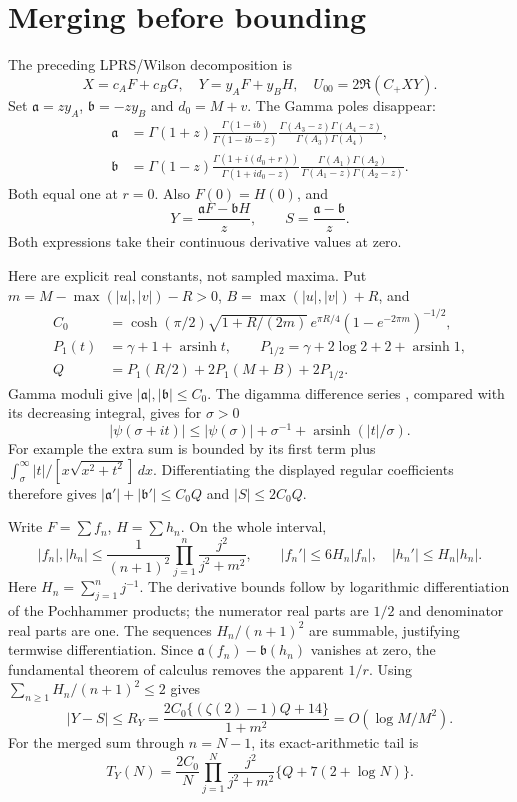 \documentclass[11pt,a4paper]{article}
\newcommand{\ga}{\mathfrak a}
\newcommand{\gb}{\mathfrak b}
\begin{document}
\newpage
\section{Merging before bounding}
The preceding LPRS/Wilson decomposition \cite{lprs,wilson} is
\[
 X=c_AF+c_BG,\quad Y=y_AF+y_BH,\quad U_{00}=2\Re(C_+XY).
\]
Set $\ga=zy_A$, $\gb=-zy_B$ and $d_0=M+v$. The Gamma poles disappear:
\begin{align*}
 \ga&=\Gamma(1+z)\frac{\Gamma(1-ib)}{\Gamma(1-ib-z)}
       \frac{\Gamma(A_3-z)\Gamma(A_4-z)}{\Gamma(A_3)\Gamma(A_4)},\\
 \gb&=\Gamma(1-z)\frac{\Gamma(1+i(d_0+r))}{\Gamma(1+id_0-z)}
       \frac{\Gamma(A_1)\Gamma(A_2)}{\Gamma(A_1-z)\Gamma(A_2-z)}.
\end{align*}
Both equal one at $r=0$. Also $F(0)=H(0)$, and
\begin{equation}
 Y=\frac{\ga F-\gb H}{z},\qquad S=\frac{\ga-\gb}{z}.
 \label{merged}
\end{equation}
Both expressions take their continuous derivative values at zero.

Here are explicit real constants, not sampled maxima. Put
$m=M-\max(|u|,|v|)-R>0$, $B=\max(|u|,|v|)+R$, and
\begin{align*}
 C_0&=\cosh(\pi/2)\sqrt{1+R/(2m)}\,
       e^{\pi R/4}(1-e^{-2\pi m})^{-1/2},\\
 P_1(t)&=\gamma+1+\operatorname{arsinh}t,\qquad
 P_{1/2}=\gamma+2\log2+2+\operatorname{arsinh}1,\\
 Q&=P_1(R/2)+2P_1(M+B)+2P_{1/2}.
\end{align*}
Gamma moduli give $|\ga|,|\gb|\le C_0$.
The digamma difference series \cite{digamma}, compared with its
decreasing integral, gives for $\sigma>0$
\[
 |\psi(\sigma+it)|\le|\psi(\sigma)|+\sigma^{-1}
                         +\operatorname{arsinh}(|t|/\sigma).
\]
For example the extra sum is bounded by its first term plus
$\int_\sigma^\infty |t|/[x\sqrt{x^2+t^2}]\,dx$.
Differentiating the displayed regular coefficients therefore gives
$|\ga'|+|\gb'|\le C_0Q$ and $|S|\le2C_0Q$.

Write $F=\sum f_n$, $H=\sum h_n$. On the whole interval,
\[
 |f_n|,|h_n|\le\frac{1}{(n+1)^2}
              \prod_{j=1}^{n}\frac{j^2}{j^2+m^2},
 \qquad |f_n'|\le6H_n|f_n|,\quad |h_n'|\le H_n|h_n|.
\]
Here $H_n=\sum_{j=1}^n j^{-1}$. The derivative bounds follow by
logarithmic differentiation of the Pochhammer products; the numerator
real parts are $1/2$ and denominator real parts are one.
The sequences $H_n/(n+1)^2$ are summable, justifying termwise
differentiation. Since $\ga(f_n)-\gb(h_n)$ vanishes at zero,
the fundamental theorem of calculus removes the apparent $1/r$.
Using $\sum_{n\ge1}H_n/(n+1)^2\le2$ gives
\begin{equation}
 |Y-S|\le R_Y=
 \frac{2C_0\{(\zeta(2)-1)Q+14\}}{1+m^2}
 =O(\log M/M^2).
 \label{RY}
\end{equation}
For the merged sum through $n=N-1$, its exact-arithmetic tail is
\begin{equation}
 T_Y(N)=\frac{2C_0}{N}
 \prod_{j=1}^{N}\frac{j^2}{j^2+m^2}
 \{Q+7(2+\log N)\}.
 \label{tail}
\end{equation}
\end{document}
